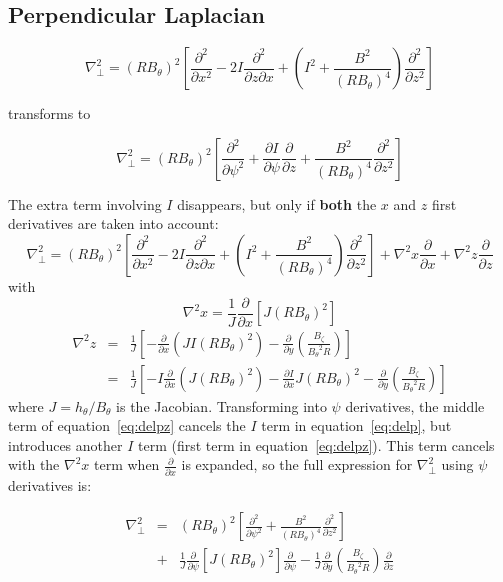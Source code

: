 \documentclass[12pt]{article}
\newcommand{\deriv}[2]{\ensuremath{\frac{\partial #1}{\partial #2}}}
\newcommand{\dderiv}[2]{\ensuremath{\frac{\partial^2 #1}{\partial {#2}^2}}}
\newcommand{\hthe}{\ensuremath{h_\theta}}
\newcommand{\Bp}{\ensuremath{B_\theta}}
\newcommand{\Bt}{\ensuremath{B_\zeta}}
\newcommand{\delp}{\nabla_\perp^2}
\newcommand{\rbp}{\ensuremath{R\Bp}}
\newcommand{\rbpsq}{\ensuremath{\left(\rbp\right)^2}}
\begin{document}
\subsection{Perpendicular Laplacian}

\[
\delp = \rbpsq\left[\dderiv{}{x} - 2I\frac{\partial^2}{\partial z\partial x} + \left(I^2 + \frac{B^2}{\left(\rbp\right)^4}\right)\dderiv{}{z}\right]
\]

transforms to

\begin{equation}
\delp = \rbpsq\left[\dderiv{}{\psi} + \deriv{I}{\psi}\deriv{}{z} + \frac{B^2}{\left(\rbp\right)^4}\dderiv{}{z}\right]
\label{eq:delp}
\end{equation}

The extra term involving $I$ disappears, but only if {\bf  both} the $x$ and $z$ first derivatives are taken into account:
\[
\delp = \rbpsq\left[\dderiv{}{x} - 2I\frac{\partial^2}{\partial z\partial x} + \left(I^2 + \frac{B^2}{\left(\rbp\right)^4}\right)\dderiv{}{z}\right] + \nabla^2 x \deriv{}{x} + \nabla^2 z\deriv{}{z} 
\]
with
\[
\nabla^2 x = \frac{1}{J}\deriv{}{x}\left[J\rbpsq\right]
\]
\begin{eqnarray}
\nabla^2 z &=& \frac{1}{J}\left[-\deriv{}{x}\left(JI\rbpsq\right) - \deriv{}{y}\left(\frac{\Bt}{\Bp^2R}\right)\right] \nonumber \\
&=& \frac{1}{J}\left[-I\deriv{}{x}\left(J\rbpsq\right) - \deriv{I}{x}J\rbpsq - \deriv{}{y}\left(\frac{\Bt}{\Bp^2R}\right)\right] \label{eq:delpz}
\end{eqnarray}
where $J=\hthe / \Bp$ is the Jacobian. Transforming into $\psi$ derivatives, the middle term of equation~\ref{eq:delpz} cancels the $I$ term in equation~\ref{eq:delp}, but introduces another $I$ term (first term in equation~\ref{eq:delpz}). This term cancels with the $\nabla^2 x$ term when $\deriv{}{x}$ is expanded, so the full expression for $\delp$ using $\psi$ derivatives is:

\begin{eqnarray}
\delp &=& \rbpsq\left[\dderiv{}{\psi} + \frac{B^2}{\left(\rbp\right)^4}\dderiv{}{z}\right] \nonumber \\
&+& \frac{1}{J}\deriv{}{\psi}\left[J\rbpsq\right]\deriv{}{\psi} - \frac{1}{J}\deriv{}{y}\left(\frac{\Bt}{\Bp^2R}\right)\deriv{}{z}
\label{eq:delp_shift}
\end{eqnarray}
\end{document}
